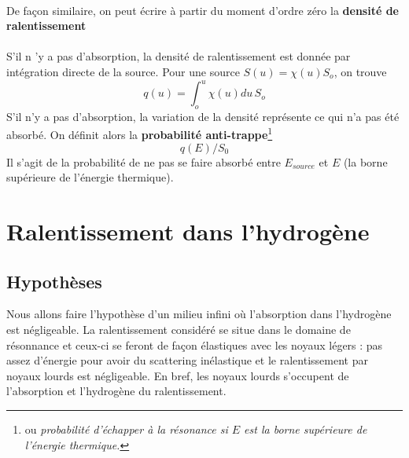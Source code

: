 	\ \\
	
	De façon similaire, on peut écrire à partir du moment d'ordre zéro la \textbf{densité de 
	ralentissement}\ \\
	
	\ \\
	
	S'il n 'y a pas d'absorption, la densité de ralentissement est donnée par intégration directe 
	de la source. Pour une source $S(u) = \chi (u){S_o}$, on trouve 
	\begin{equation}
	q(u) = \int_o^u  \chi (u)du\,{S_o}
	\end{equation}
	S'il n'y a pas d'absorption, la variation de la densité représente ce qui n'a pas été 
	absorbé. On définit alors la \textbf{probabilité anti-trappe}\footnote{ou \textit{probabilité 
	d'échapper à la résonance si $E$ est la borne supérieure de l'énergie thermique.}}
	\begin{equation}
	q(E)/S_0
	\end{equation}
	Il s'agit de la probabilité de ne pas se faire absorbé entre $E_{source}$ et $E$ (la borne 
	supérieure de l'énergie thermique).
	
	
	
\section{Ralentissement dans l'hydrogène}
	\subsection{Hypothèses}
	Nous allons faire l'hypothèse d'un milieu infini où l'absorption dans l'hydrogène est 
	négligeable. La ralentissement considéré se situe dans le domaine de résonnance et ceux-ci se
	feront de façon élastiques avec les noyaux légers : pas assez d'énergie pour avoir du 
	scattering inélastique et le ralentissement par noyaux lourds est négligeable. 
	En bref, les noyaux lourds s'occupent de l'absorption et l'hydrogène du ralentissement.
	
